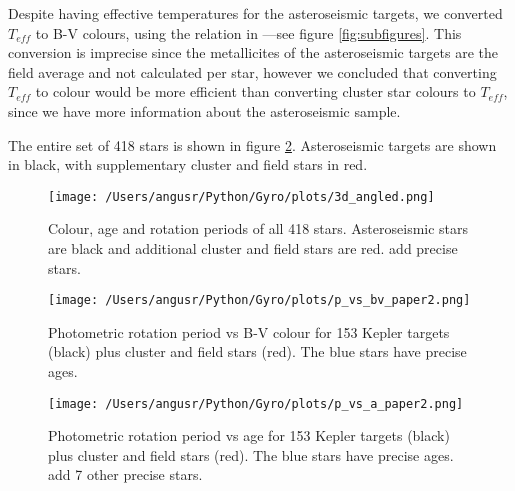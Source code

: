 \documentclass[10pt,preprint]{aastex}
\begin{document}
Despite having effective temperatures for the asteroseismic targets, we converted $T_{eff}$ to B-V colours, using the relation in \citet{Sekiguchi2000}---see figure \ref{fig:subfigures}.
This conversion is imprecise since the metallicites of the asteroseismic targets are the field average and not calculated per star, however we concluded that converting $T_{eff}$ to colour would be more efficient than converting cluster star colours to $T_{eff}$, since we have more information about the asteroseismic sample.

The entire set of 418 stars is shown in figure \ref{fig:3d}. Asteroseismic targets are shown in black, with supplementary cluster and field stars in red.

\begin{figure}[ht]
\begin{center}
\texttt{[image: /Users/angusr/Python/Gyro/plots/3d\_angled.png]}
\caption{Colour, age and rotation periods of all 418 stars. Asteroseismic stars are black and additional cluster and field stars are red. {\color{red}add precise stars.}}
\label{fig:3d}
\end{center}
\end{figure}

\begin{figure}[ht]
\begin{center}
\texttt{[image: /Users/angusr/Python/Gyro/plots/p\_vs\_bv\_paper2.png]}
\caption{Photometric rotation period vs B-V colour for 153 Kepler targets (black) plus cluster and field stars (red). The blue stars have precise ages.}
\label{fig:3d}
\end{center}
\end{figure}

\begin{figure}[ht]
\begin{center}
\texttt{[image: /Users/angusr/Python/Gyro/plots/p\_vs\_a\_paper2.png]}
\caption{Photometric rotation period vs age for 153 Kepler targets (black) plus cluster and field stars (red). The blue stars have precise ages. {\color{red} add 7 other precise stars.}}
\label{fig:p_vs_a}
\end{center}
\end{figure}



\end{document}
